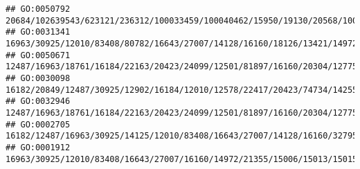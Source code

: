 \documentclass[
]{article}
\begin{document}
\begin{verbatim}
## GO:0050792                                                                                                                                                                                                 20684/102639543/623121/236312/100033459/100040462/15950/19130/20568/100038882/23962/231655/246728/246727/23961/23960/246730/94094/76681/434219/20128/209387/68713/69550/20304/58185/12265/17858/224762/16149
## GO:0031341                                                                                                                                                                                                                                     16963/30925/12010/83408/80782/16643/27007/14128/16160/18126/13421/14972/21354/21355/15006/15013/15015/110557/15018/68395/110558/15039/100529082/15024/667977/14990/20400
## GO:0050671                                                                                                                                                                                                                                         12487/16963/18761/16184/22163/20423/24099/12501/81897/16160/20304/12775/20533/14165/321019/72049/320484/15000/14999/547431/11629/16149/12511/60533/58205/20371/12229
## GO:0030098                                                                                                            16182/20849/12487/30925/12902/16184/12010/12578/22417/20423/74734/14255/16205/83408/12525/12515/12518/272382/11833/12478/24099/12502/12500/12501/18985/12047/81897/67596/16160/12775/15985/58185/16364/110168/321019/12458/57757/15001/14998/14960/100038862/624681/16149/12482/20371/16186/12229
## GO:0032946                                                                                                                                                                                                                                         12487/16963/18761/16184/22163/20423/24099/12501/81897/16160/20304/12775/20533/14165/321019/72049/320484/15000/14999/547431/11629/16149/12511/60533/58205/20371/12229
## GO:0002705                                                                                                                                                                                                                  16182/12487/16963/30925/14125/12010/83408/16643/27007/14128/16160/327957/58185/14972/21355/15006/15013/15015/110557/15018/68395/110558/15039/100529082/15024/667977/14990/20371/20400/12229
## GO:0001912                                                                                                                                                                                                                                                                   16963/30925/12010/83408/16643/27007/16160/14972/21355/15006/15013/15015/110557/15018/68395/110558/15039/100529082/15024/667977/14990/20400

\end{verbatim}
\end{document}
